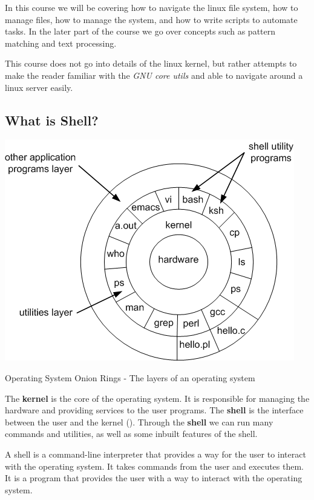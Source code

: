 In this course we will be covering how to navigate the linux file system, how to manage files, how to manage the system, and how to write scripts to automate tasks. In the later part of the course we go over concepts such as pattern matching and text processing.

This course does not go into details of the linux kernel, but rather attempts to make the reader familiar with the \textit{GNU core utils} and able to navigate around a linux server easily.

\subsection{What is Shell?}

\begin{marginfigure}
	\includegraphics{images/png/os-onion.png}
	\caption[Operating System Onion Rings]{
	  Operating System Onion Rings - The layers of an operating system
  }
\end{marginfigure}

The \textbf{kernel} is the core of the operating system. It is responsible for managing the hardware and providing services to the user programs. The \textbf{shell} is the interface between the user and the kernel (). Through the \textbf{shell} we can run many commands and utilities, as well as some inbuilt features of the shell.

\begin{definition}[Shell]
  A shell is a command-line interpreter that provides a way for the user to interact with the operating system. It takes commands from the user and executes them. It is a program that provides the user with a way to interact with the operating system.
\end{definition}

